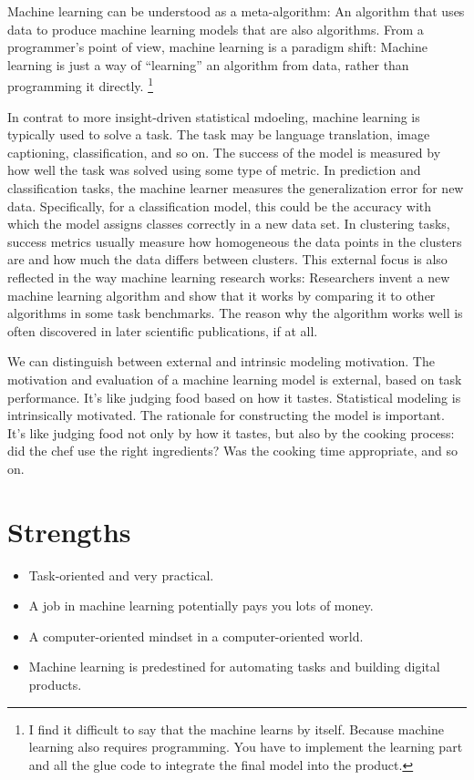 \documentclass[
  10pt,
]{scrbook}
\providecommand{\tightlist}{%
  \setlength{\itemsep}{0pt}\setlength{\parskip}{0pt}}
\begin{document}
Machine learning can be understood as a meta-algorithm:
An algorithm that uses data to produce machine learning models that are also algorithms.
From a programmer's point of view, machine learning is a paradigm shift:
Machine learning is just a way of ``learning'' an algorithm from data, rather than programming it directly. \footnote{I find it difficult to say that the machine learns by itself. Because machine learning also requires programming. You have to implement the learning part and all the glue code to integrate the final model into the product.}

In contrat to more insight-driven statistical mdoeling, machine learning is typically used to solve a task.
The task may be language translation, image captioning, classification, and so on.
The success of the model is measured by how well the task was solved using some type of metric.
In prediction and classification tasks, the machine learner measures the generalization error for new data.
Specifically, for a classification model, this could be the accuracy with which the model assigns classes correctly in a new data set.
In clustering tasks, success metrics usually measure how homogeneous the data points in the clusters are and how much the data differs between clusters.
This external focus is also reflected in the way machine learning research works:
Researchers invent a new machine learning algorithm and show that it works by comparing it to other algorithms in some task benchmarks.
The reason why the algorithm works well is often discovered in later scientific publications, if at all.

We can distinguish between external and intrinsic modeling motivation.
The motivation and evaluation of a machine learning model is external, based on task performance.
It's like judging food based on how it tastes.
Statistical modeling is intrinsically motivated.
The rationale for constructing the model is important.
It's like judging food not only by how it tastes, but also by the cooking process: did the chef use the right ingredients? Was the cooking time appropriate, and so on.

\hypertarget{strengths-5}{%
\section{Strengths}\label{strengths-5}}

\begin{itemize}
\tightlist
\item
  Task-oriented and very practical.
\item
  A job in machine learning potentially pays you lots of money.
\item
  A computer-oriented mindset in a computer-oriented world.
\item
  Machine learning is predestined for automating tasks and building digital products.
\end{itemize}
\end{document}

